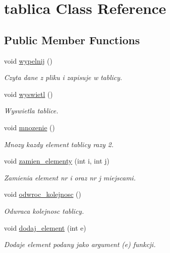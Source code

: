 \hypertarget{classtablica}{\section{tablica \-Class \-Reference}
\label{classtablica}
}
\subsection*{\-Public \-Member \-Functions}
\begin{DoxyCompactItemize}
\item 
void \hyperlink{classtablica_a2e787e39230c5bdcfa4a5b853f949021}{wypelnij} ()
\begin{DoxyCompactList}\small\item\em \-Czyta dane z pliku i zapisuje w tablicy. \end{DoxyCompactList}\item 
void \hyperlink{classtablica_a2b47856f4150aa2386a56b4aef8f8f5a}{wyswietl} ()
\begin{DoxyCompactList}\small\item\em \-Wyswietla tablice. \end{DoxyCompactList}\item 
void \hyperlink{classtablica_acb57cdc80f4bea556af98343d280419b}{mnozenie} ()
\begin{DoxyCompactList}\small\item\em \-Mnozy kazdy element tablicy razy 2. \end{DoxyCompactList}\item 
void \hyperlink{classtablica_a26a5a71d013d0284ff0f6b7648444a5e}{zamien\-\_\-elementy} (int i, int j)
\begin{DoxyCompactList}\small\item\em \-Zamienia element nr i oraz nr j miejscami. \end{DoxyCompactList}\item 
void \hyperlink{classtablica_aad3f11f312e1e3205049f5154c70c9e6}{odwroc\-\_\-kolejnosc} ()
\begin{DoxyCompactList}\small\item\em \-Odwraca kolejnosc tablicy. \end{DoxyCompactList}\item 
void \hyperlink{classtablica_aa1f8d3f1ac7cb8a60b305173adb1ef70}{dodaj\-\_\-element} (int e)
\begin{DoxyCompactList}\small\item\em \-Dodaje element podany jako argument (e) funkcji. \end{DoxyCompactList}\item 

\end{DoxyCompactItemize}
